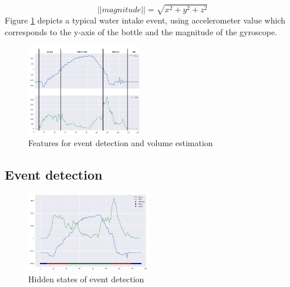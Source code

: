 \begin{equation}
||magnitude|| = \sqrt{x^2+y^2+z^2}    
\end{equation}
Figure \ref{fig:features} depicts a typical water intake event, using accelerometer value which corresponds to the y-axis of the bottle and the magnitude of the gyroscope. 

\begin{figure}
\centering
  \includegraphics[width=0.45\textwidth]{assets/features.png}
\caption{Features for event detection and volume estimation}
\label{fig:features}
\end{figure}

\subsection{Event detection}

\begin{figure}
\centering
\includegraphics[width=0.48\textwidth]{assets/spotting.png}
\caption{Hidden states of event detection}
\label{fig:hidden_states}
\end{figure}

